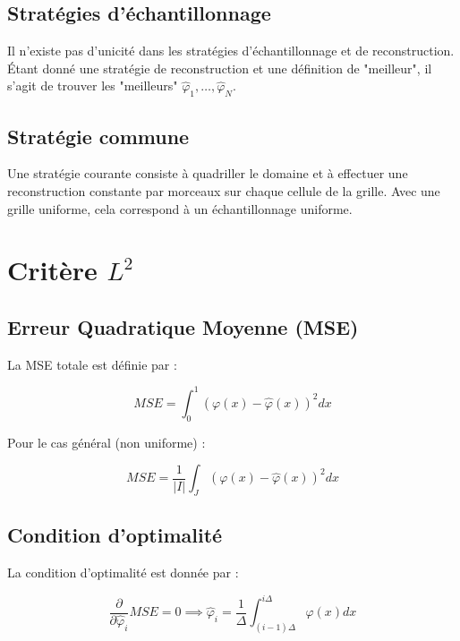 \documentclass[12pt]{article}
\begin{document}
\subsection{Stratégies d'échantillonnage}

Il n'existe pas d'unicité dans les stratégies d'échantillonnage et de reconstruction. Étant donné une stratégie de reconstruction et une définition de "meilleur", il s'agit de trouver les "meilleurs" $\hat{\varphi}_1, \ldots, \hat{\varphi}_N$.


\subsection{Stratégie commune}

Une stratégie courante consiste à quadriller le domaine et à effectuer une reconstruction constante par morceaux sur chaque cellule de la grille. Avec une grille uniforme, cela correspond à un échantillonnage uniforme.

\newpage

\section{Critère $L^2$}

\subsection{Erreur Quadratique Moyenne (MSE)}

La MSE totale est définie par :

\begin{equation}
MSE = \int_0^1 (\varphi(x) - \hat{\varphi}(x))^2 dx
\end{equation}

Pour le cas général (non uniforme) :

\begin{equation}
MSE = \frac{1}{|I|} \int_J (\varphi(x) - \hat{\varphi}(x))^2 dx
\end{equation}

\subsection{Condition d'optimalité}

La condition d'optimalité est donnée par :

\begin{equation}
\frac{\partial}{\partial \hat{\varphi}_i} MSE = 0 \implies \hat{\varphi}_i = \frac{1}{\Delta} \int_{(i-1)\Delta}^{i\Delta} \varphi(x) dx
\end{equation}
\end{document}
